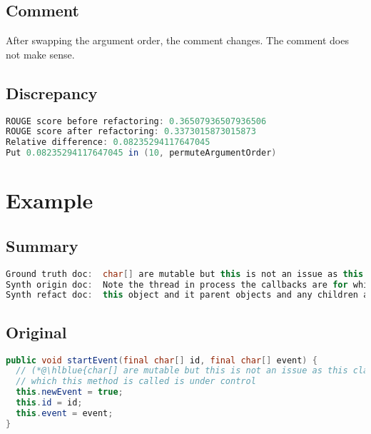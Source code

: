 \documentclass[11pt]{article}
\DeclareRobustCommand{\hlblue}[1]{{\sethlcolor{SeaGreen}\hl{#1}}}
\DeclareRobustCommand{\hlblue}[1]{{\sethlcolor{SkyBlue}\hl{#1}}}
\begin{document}
\subsection{Comment}

After swapping the argument order, the comment changes. The comment does not make sense.

\subsection{Discrepancy}

\begin{lstlisting}[language=java]
ROUGE score before refactoring: 0.36507936507936506
ROUGE score after refactoring: 0.3373015873015873
Relative difference: 0.08235294117647045
Put 0.08235294117647045 in (10, permuteArgumentOrder)
\end{lstlisting}





\pagebreak
\section{Example}
\subsection{Summary}

\begin{lstlisting}[language=java]
Ground truth doc:  char[] are mutable but this is not an issue as this class is package-protected and the code from
Synth origin doc:  Note the thread in process the callbacks are for which event listeners and thus that it identifies a
Synth refact doc:  this object and it parent objects and any children are hidden if a parent control the element whose object
\end{lstlisting}


\subsection{Original}
\begin{lstlisting}[language=java]
public void startEvent(final char[] id, final char[] event) {
  // (*@\hlblue{char[] are mutable but this is not an issue as this class is package-protected and the code from}@*)
  // which this method is called is under control
  this.newEvent = true;
  this.id = id;
  this.event = event;
}
\end{lstlisting}
\end{document}

